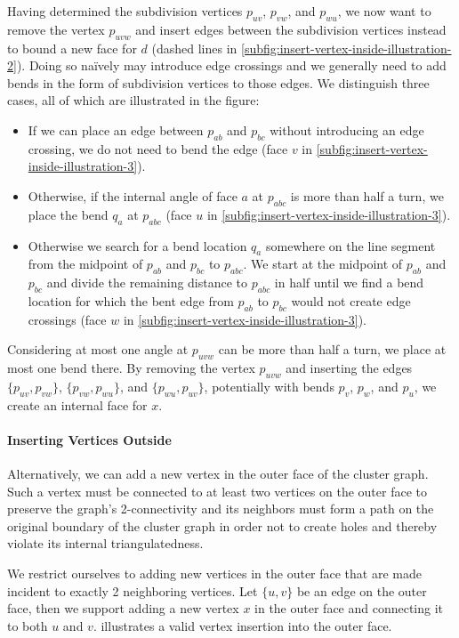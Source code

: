 Having determined the subdivision vertices $p_{uv}$, $p_{vw}$, and $p_{wu}$, we now want to remove the vertex $p_{uvw}$ and insert edges between the subdivision vertices instead to bound a new face for $d$ (dashed lines in \cref{subfig:insert-vertex-inside-illustration-2}). Doing so naïvely may introduce edge crossings and we generally need to add bends in the form of subdivision vertices to those edges. We distinguish three cases, all of which are illustrated in the figure:
%
\begin{itemize}
	\item If we can place an edge between $p_{ab}$ and $p_{bc}$ without introducing an edge crossing, we do not need to bend the edge (face $v$ in \cref{subfig:insert-vertex-inside-illustration-3}).
	\item Otherwise, if the internal angle of face $a$ at $p_{abc}$ is more than half a turn, we place the bend $q_a$ at $p_{abc}$ (face $u$ in \cref{subfig:insert-vertex-inside-illustration-3}).
	\item Otherwise we search for a bend location $q_a$ somewhere on the line segment from the midpoint of $p_{ab}$ and $p_{bc}$ to $p_{abc}$. We start at the midpoint of $p_{ab}$ and $p_{bc}$ and divide the remaining distance to $p_{abc}$ in half until we find a bend location for which the bent edge from $p_{ab}$ to $p_{bc}$ would not create edge crossings (face $w$ in \cref{subfig:insert-vertex-inside-illustration-3}).
\end{itemize}

Considering at most one angle at $p_{uvw}$ can be more than half a turn, we place at most one bend there. By removing the vertex $p_{uvw}$ and inserting the edges $\{p_{uv},p_{vw}\}$, $\{p_{vw},p_{wu}\}$, and $\{p_{wu},p_{uv}\}$, potentially with bends $p_v$, $p_w$, and $p_u$, we create an internal face for $x$.



\paragraph{Inserting Vertices Outside}

Alternatively, we can add a new vertex in the outer face of the cluster graph. Such a vertex must be connected to at least two vertices on the outer face to preserve the graph's 2-connectivity and its neighbors must form a path on the original boundary of the cluster graph in order not to create holes and thereby violate its internal triangulatedness.

We restrict ourselves to adding new vertices in the outer face that are made incident to exactly 2 neighboring vertices. Let $\{u,v\}$ be an edge on the outer face, then we support adding a new vertex $x$ in the outer face and connecting it to both $u$ and $v$.  illustrates a valid vertex insertion into the outer face.

